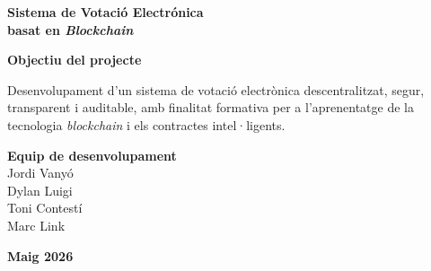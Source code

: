 \documentclass[12pt,a4paper]{article}
\begin{document}
\begin{titlepage}
    \centering

    {\huge\textbf{Sistema de Votació Electrónica \\ basat en \textit{Blockchain}}\par}
    

    \vspace{2.5cm} %

    \begin{center}
        \textbf{\large Objectiu del projecte}\\[0.5cm]
        \parbox{0.85\textwidth}{
            \centering
            Desenvolupament d'un sistema de votació electrònica descentralitzat,
            segur, transparent i auditable, amb finalitat formativa per a l'aprenentatge
            de la tecnologia \textit{blockchain} i els contractes intel·ligents.
        }
    \end{center}

    \vspace{3cm} %

    \textbf{\large Equip de desenvolupament}\\[0.8cm]
    {\large
        Jordi Vanyó \\
        Dylan Luigi \\
        Toni Contestí \\
        Marc Link
    }
    
    \vfill %

    {\large \textbf{Maig 2026}}
    \vspace*{1cm} %

\end{titlepage}
\end{document}

